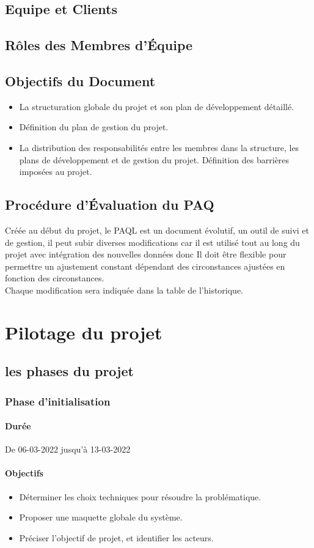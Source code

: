 \documentclass[11pt,fleqn]{book} %
\begin{document}
\section{Equipe et Clients}
\newpage
\section{Rôles des Membres d’Équipe}
\newpage
\section{Objectifs du Document}
\begin{itemize}
    \item La structuration globale du projet et son plan de développement détaillé.
    \item Définition du plan de gestion du projet.
    \item La distribution des responsabilités entre les membres dans la structure, les plans de développement et de gestion du projet. 
    \tem Définition des barrières imposées au projet.
\end{itemize}
\section{ Procédure d’Évaluation du PAQ}
Créée au début du projet, le PAQL est un document évolutif, un outil de suivi et de gestion, il peut subir diverses modifications car il est utilisé tout au long du projet avec intégration des nouvelles données donc Il doit être flexible pour permettre un ajustement constant dépendant des circonstances ajustées en fonction des circonstances.\\
Chaque modification sera indiquée dans la table de l’historique.
\chapter{Pilotage du projet}
\section{les phases du projet}
\subsection{ Phase d’initialisation}
\subsubsection{Durée}
De 06-03-2022 jusqu’à 13-03-2022
\subsubsection{Objectifs}
\begin{itemize}
    \item  Déterminer les choix techniques pour résoudre la problématique.
    \item  Proposer une maquette globale du système.
    \item  Préciser l’objectif de projet, et identifier les acteurs.
\end{itemize}
\end{document}
